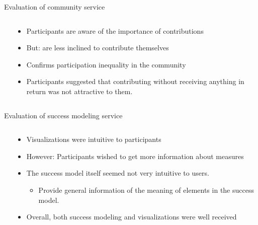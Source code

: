 \begin{frame}{Evaluation of community service}
  \begin{columns}
    \begin{column}[t]{0.5\textwidth}
      
    \end{column}
    \begin{column}[t]{0.5\textwidth}
      \begin{itemize}
        \item Participants are aware of the importance of contributions
        \item But: are less inclined to contribute themselves
        \item Confirms participation inequality in the community  \cite{Niel06}
       \item Participants suggested that contributing without receiving anything in return was not attractive to them.
      \end{itemize}
    \end{column}
  \end{columns}
\end{frame}

\begin{frame}{Evaluation of success modeling service}
  \begin{columns}
    \begin{column}[t]{0.5\textwidth}
      
    \end{column}
    \begin{column}[t]{0.5\textwidth}
      \begin{itemize}
        \item Visualizations were intuitive to participants
        \item However: Participants wished to get more information about measures
        \item The success model itself seemed not very intuitive to users.
        \begin{itemize}
          \item Provide general information of the meaning of elements in the success model.
        \end{itemize}
        \item Overall, both success modeling and visualizations were well received
      \end{itemize}
    \end{column}
  \end{columns}
\end{frame}


